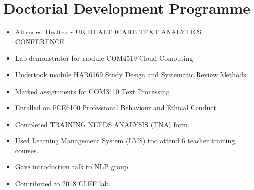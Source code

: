 \chapter{Doctorial Development Programme} \label{lit}


\begin{itemize}
  \item Attended Healtex - UK HEALTHCARE TEXT ANALYTICS CONFERENCE
  \item Lab demonstrator for module COM4519 Cloud Computing
  \item Undertook module HAR6169 Study Design and Systematic Review Methods
  \item Marked assignments for COM3110 Text Processing
  \item Enrolled on FCE6100 Professional Behaviour and Ethical Conduct
  \item Completed TRAINING NEEDS ANALYSIS (TNA) form.
  \item Used Learning Management System (LMS) too attend 6 teacher training courses.
  \item Gave introduction talk to NLP group.
  \item Contributed to 2018 CLEF lab.
  
  
\end{itemize}
